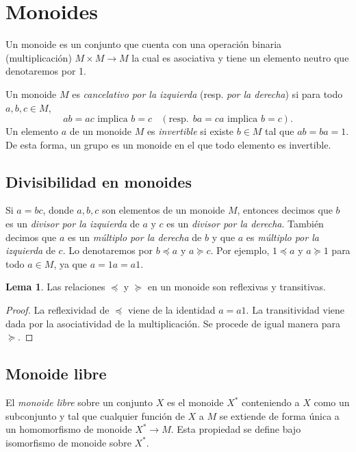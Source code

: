 \documentclass[12pt]{book}
\theoremstyle{definition}
\newtheorem{lema}{Lema}[section]
\begin{document}
\section{Monoides}

Un monoide es un conjunto que cuenta con una operación binaria (multiplicación) $M\times M \rightarrow M$ la cual es asociativa y tiene un elemento neutro que denotaremos por 1. 

Un monoide $M$ es \textit{cancelativo por la izquierda} (resp. \textit{por la derecha}) si para todo $a,b,c\in M$,
$$ab=ac\text{ implica } b=c\ \ \ \ (\textrm{resp.}\ \  ba=ca \text{ implica } b=c).$$
Un elemento $a$ de un monoide $M$ es \textit{invertible} si existe $b\in M$ tal que $ab=ba=1$. De esta forma, un grupo es un monoide en el que todo elemento es invertible.



\subsection{Divisibilidad en monoides}

Si $a=bc$, donde $a,b,c$ son elementos de un monoide $M$, entonces decimos que $b$ es un \textit{divisor por la izquierda} de $a$ y $c$ es un \textit{divisor por la derecha}. También decimos que $a$ es un \textit{múltiplo por la derecha} de $b$ y que $a$ es \textit{múltiplo por la izquierda} de $c$. Lo denotaremos por $b\preceq a$ y $a\succeq c$. Por ejemplo, $1\preceq a$ y $a\succeq 1$ para todo $a\in M$, ya que $a=1a=a1$.

\begin{lema}
Las relaciones $\preceq$ y $\succeq$ en un monoide son reflexivas y transitivas.
\label{lema:rel1}
\end{lema}

\begin{proof} La reflexividad de $\preceq$ viene de la identidad $a=a1$. La transitividad viene dada por la asociatividad de la multiplicación. Se procede de igual manera para $\succeq$.
\end{proof}

\subsection{Monoide libre}
El \textit{monoide libre} sobre un conjunto $X$ es el monoide $X^*$ conteniendo a $X$ como un subconjunto y tal que cualquier función de $X$ a $M$ se extiende de forma única a un homomorfismo de monoide $X^*\rightarrow M$. Esta propiedad se define bajo isomorfismo de monoide sobre $X^*$.
\end{document}
